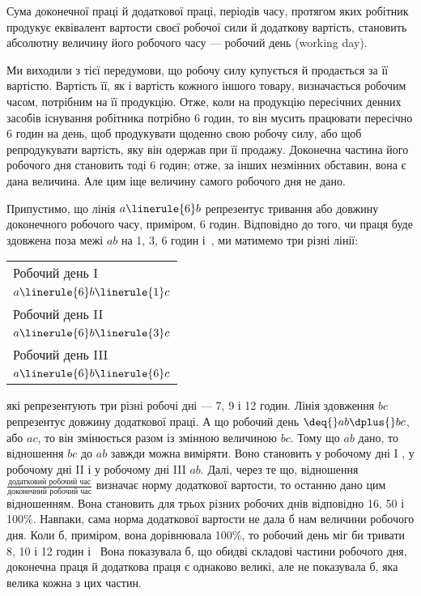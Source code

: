 
Сума доконечної праці й додаткової праці, періодів часу,
протягом яких робітник продукує еквівалент вартости своєї робочої
сили й додаткову вартість, становить абсолютну величину
його робочого часу — робочий день (working day).


Ми виходили з тієї передумови, що робочу силу купується
й продається за її вартістю. Вартість її, як і вартість кожного
іншого товару, визначається робочим часом, потрібним на
її продукцію. Отже, коли на продукцію пересічних денних засобів
існування робітника потрібно 6 годин, то він мусить працювати
пересічно 6 годин на день, щоб продукувати щоденно свою робочу
силу, або щоб репродукувати вартість, яку він одержав при її
продажу. Доконечна частина його робочого дня становить тоді
6 годин; отже, за інших незмінних обставин, вона є дана величина.
Але цим іще величину самого робочого дня не дано.

Припустимо, що лінія $a\linerule{6}b$ репрезентує тривання
або довжину доконечного робочого часу, приміром, 6 годин. Відповідно
до того, чи праця буде здовжена поза межі $ab$ на 1, 3,
6 годин і~, ми матимемо три різні лінії:

\bigskip
\begin{table}[H]
\centering
\noindent\begin{tabular}{l}
Робочий день I \\
$a\linerule{6}b\linerule{1}c$ \\
\addlinespace
Робочий день II \\
$a\linerule{6}b\linerule{3}c$ \\
\addlinespace
Робочий день III \\
$a\linerule{6}b\linerule{6}c$ \\
\end{tabular}
\end{table}

\bigskip
\noindent{}які репрезентують три різні робочі дні — 7, 9 і 12 годин. Лінія
здовження $bc$ репрезентує довжину додаткової праці. А що робочий
день $\deq{} ab \dplus{} bc$, або $ac$, то він змінюється разом із змінною
величиною $bc$. Тому що $ab$ дано, то відношення $bc$ до $ab$ завжди
можна виміряти. Воно становить у робочому дні I , у робочому
дні II  і у робочому дні III  $ab$. Далі, через те що, відношення
$\frac{\text{додатковий робочий час}}{\text{доконечний робочий час}}$ визначає норму додаткової вартости, то
останню дано цим відношенням. Вона становить для трьох різних
робочих днів відповідно 16, 50 і 100\%. Навпаки, сама норма
додаткової вартости не дала б нам величини робочого дня. Коли
б, приміром, вона дорівнювала 100\%, то робочий день міг би
тривати 8, 10 і 12 годин і~ Вона показувала б, що обидві
складові частини робочого дня, доконечна праця й додаткова
праця є однаково великі, але не показувала б, яка велика кожна
з цих частин.

